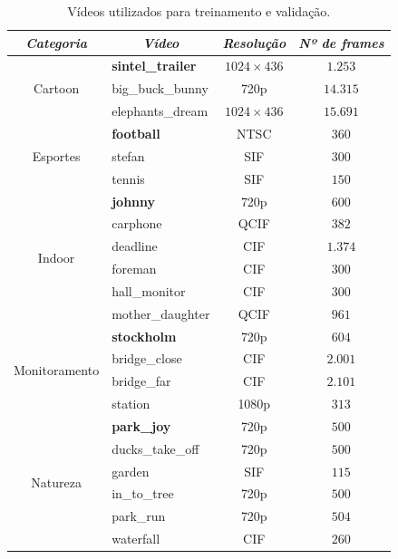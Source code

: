 \documentclass[cic,tc]{iiufrgs}
\begin{document}
\begin{table}[h]
    \caption{Vídeos utilizados para treinamento e validação.}
    \centering
        \begin{tabular}{|c|l|c|c|}
          \hline
          \multicolumn{1}{|c}{\textit{Categoria}} & 
          \multicolumn{1}{|c}{\textit{Vídeo}} & 
          \multicolumn{1}{|c}{\textit{Resolução}} & 
          \multicolumn{1}{|c|}{\textit{Nº de frames}}  \\
          \hline
          \hline
          \multirow{3}{*}{Cartoon} 
          & \textbf{sintel\_trailer} & $1024\times436$ & $ 1.253 $ \\ 
          & big\_buck\_bunny & 720p & $ 14.315 $ \\
          & elephants\_dream & $1024\times436$ & $ 15.691 $ \\
          \hline
          \multirow{3}{*}{Esportes} 
          & \textbf{football} & NTSC & $360$ \\
          & stefan & SIF & $300$ \\ 
          & tennis & SIF & $150$ \\
          \hline
          \multirow{6}{*}{Indoor} 
          & \textbf{johnny} & 720p & $600$ \\ 
          & carphone & QCIF & $382$ \\
          & deadline & CIF & $1.374$ \\
          & foreman & CIF & $300$ \\
          & hall\_monitor & CIF & $300$ \\
          & mother\_daughter & QCIF & $961$ \\
          \hline
          \multirow{4}{*}{Monitoramento} 
          & \textbf{stockholm} & 720p & $604$ \\ 
          & bridge\_close & CIF & $2.001$ \\
          & bridge\_far & CIF & $2.101$ \\
          & station & 1080p & $313$ \\
          \hline 
          \multirow{6}{*}{Natureza} 
          & \textbf{park\_joy} & 720p & $500$ \\
          & ducks\_take\_off & 720p & $500$ \\
          & garden & SIF & $115$ \\
          & in\_to\_tree & 720p & $500$ \\
          & park\_run & 720p & $504$ \\
          & waterfall & CIF & $260$ \\
          \hline
        \end{tabular}
    \label{tbl:vidtrain}
\end{table}
\end{document}
